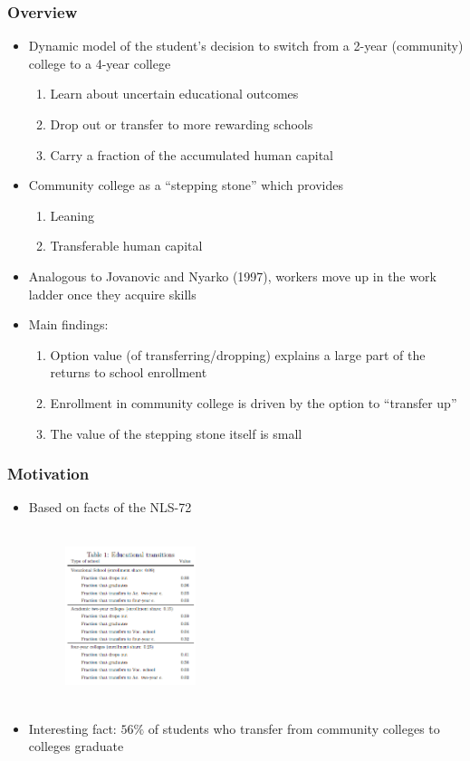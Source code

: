\begin{frame}
	\frametitle{Overview}
		\begin{itemize}
			\item Dynamic model of the student's  decision to switch from a 2-year (community) college to a 4-year college
			\begin{enumerate}
				\item Learn about uncertain educational outcomes
				\item Drop out or transfer to more rewarding schools
				\item Carry a fraction of the accumulated human capital
			\end{enumerate}
			\item Community college as a ``stepping stone'' which provides
				\begin{enumerate}
					\item Leaning
					\item Transferable human capital
				\end{enumerate}
			\item Analogous to Jovanovic and Nyarko (1997), workers move up in the work ladder once they acquire skills
			\item Main findings:
				\begin{enumerate}
					\item Option value (of transferring/dropping) explains a large part of the returns to school enrollment
					\item Enrollment in community college is driven by the option to ``transfer up''
					\item The value of the stepping stone itself is small
				\end{enumerate}
		\end{itemize}
\end{frame}

\begin{frame}
	\frametitle{Motivation}
		\begin{itemize}
			\item Based on facts of the NLS-72		
		\begin{figure}[H] 
			\caption*{}
			\centering
			\includegraphics[width=1.5in, height=2in]{Figures/T/table1.png}
		\end{figure}
		
			\item Interesting fact: $56\%$ of students who transfer from community colleges to colleges graduate		
		\end{itemize}
\end{frame}

